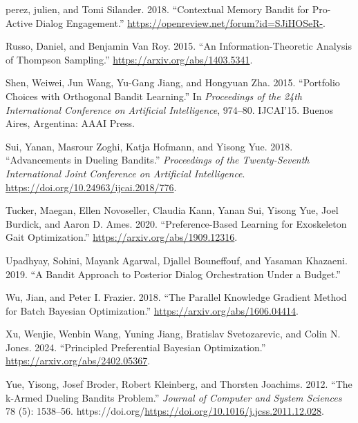 \documentclass[
  letterpaper,
  numbers=noenddot,
  DIV=11,
  oneside]{scrreprt}
\newlength{\cslhangindent}
\newenvironment{CSLReferences}[2] %
 {\begin{list}{}{%
  \setlength{\itemindent}{0pt}
  \setlength{\leftmargin}{0pt}
  \setlength{\parsep}{0pt}
  \ifodd #1
   \setlength{\leftmargin}{\cslhangindent}
   \setlength{\itemindent}{-1\cslhangindent}
  \fi
  \setlength{\itemsep}{#2\baselineskip}}}
 {\end{list}}
\theoremstyle{remark}
\begin{document}
\begin{CSLReferences}{1}{0}
perez, julien, and Tomi Silander. 2018. {``Contextual Memory Bandit for
Pro-Active Dialog Engagement.''}
\url{https://openreview.net/forum?id=SJiHOSeR-}.

Russo, Daniel, and Benjamin Van Roy. 2015. {``An Information-Theoretic
Analysis of Thompson Sampling.''} \url{https://arxiv.org/abs/1403.5341}.

Shen, Weiwei, Jun Wang, Yu-Gang Jiang, and Hongyuan Zha. 2015.
{``Portfolio Choices with Orthogonal Bandit Learning.''} In
\emph{Proceedings of the 24th International Conference on Artificial
Intelligence}, 974--80. IJCAI'15. Buenos Aires, Argentina: AAAI Press.

Sui, Yanan, Masrour Zoghi, Katja Hofmann, and Yisong Yue. 2018.
{``Advancements in Dueling Bandits.''} \emph{Proceedings of the
Twenty-Seventh International Joint Conference on Artificial
Intelligence}. \url{https://doi.org/10.24963/ijcai.2018/776}.

Tucker, Maegan, Ellen Novoseller, Claudia Kann, Yanan Sui, Yisong Yue,
Joel Burdick, and Aaron D. Ames. 2020. {``Preference-Based Learning for
Exoskeleton Gait Optimization.''}
\url{https://arxiv.org/abs/1909.12316}.

Upadhyay, Sohini, Mayank Agarwal, Djallel Bouneffouf, and Yasaman
Khazaeni. 2019. {``A Bandit Approach to Posterior Dialog Orchestration
Under a Budget.''}

Wu, Jian, and Peter I. Frazier. 2018. {``The Parallel Knowledge Gradient
Method for Batch Bayesian Optimization.''}
\url{https://arxiv.org/abs/1606.04414}.

Xu, Wenjie, Wenbin Wang, Yuning Jiang, Bratislav Svetozarevic, and Colin
N. Jones. 2024. {``Principled Preferential Bayesian Optimization.''}
\url{https://arxiv.org/abs/2402.05367}.

Yue, Yisong, Josef Broder, Robert Kleinberg, and Thorsten Joachims.
2012. {``The k-Armed Dueling Bandits Problem.''} \emph{Journal of
Computer and System Sciences} 78 (5): 1538--56.
https://doi.org/\url{https://doi.org/10.1016/j.jcss.2011.12.028}.


\end{CSLReferences}
\end{document}
